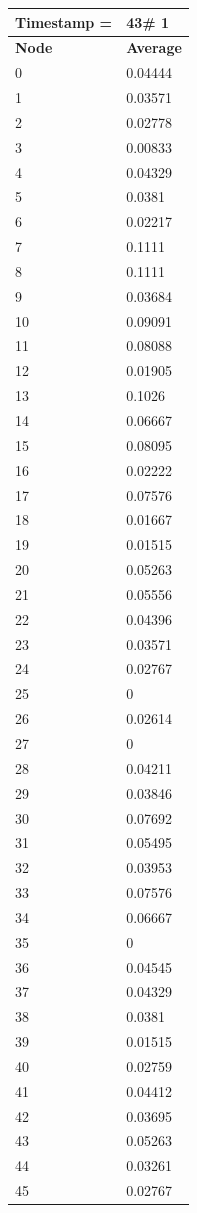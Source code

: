 \begin{tabular}{|l||l|}
\hline
\textbf{Timestamp =} & \textbf{43}\# 1\\\hline
	\textbf{Node} & \textbf{Average} \\ \hline
\hline
	0 & 0.04444 \\ \hline
	1 & 0.03571 \\ \hline
	2 & 0.02778 \\ \hline
	3 & 0.00833 \\ \hline
	4 & 0.04329 \\ \hline
	5 & 0.0381 \\ \hline
	6 & 0.02217 \\ \hline
	7 & 0.1111 \\ \hline
	8 & 0.1111 \\ \hline
	9 & 0.03684 \\ \hline
	10 & 0.09091 \\ \hline
	11 & 0.08088 \\ \hline
	12 & 0.01905 \\ \hline
	13 & 0.1026 \\ \hline
	14 & 0.06667 \\ \hline
	15 & 0.08095 \\ \hline
	16 & 0.02222 \\ \hline
	17 & 0.07576 \\ \hline
	18 & 0.01667 \\ \hline
	19 & 0.01515 \\ \hline
	20 & 0.05263 \\ \hline
	21 & 0.05556 \\ \hline
	22 & 0.04396 \\ \hline
	23 & 0.03571 \\ \hline
	24 & 0.02767 \\ \hline
	25 & 0 \\ \hline
	26 & 0.02614 \\ \hline
	27 & 0 \\ \hline
	28 & 0.04211 \\ \hline
	29 & 0.03846 \\ \hline
	30 & 0.07692 \\ \hline
	31 & 0.05495 \\ \hline
	32 & 0.03953 \\ \hline
	33 & 0.07576 \\ \hline
	34 & 0.06667 \\ \hline
	35 & 0 \\ \hline
	36 & 0.04545 \\ \hline
	37 & 0.04329 \\ \hline
	38 & 0.0381 \\ \hline
	39 & 0.01515 \\ \hline
	40 & 0.02759 \\ \hline
	41 & 0.04412 \\ \hline
	42 & 0.03695 \\ \hline
	43 & 0.05263 \\ \hline
	44 & 0.03261 \\ \hline
	45 & 0.02767 \\ \hline
\end{tabular}
